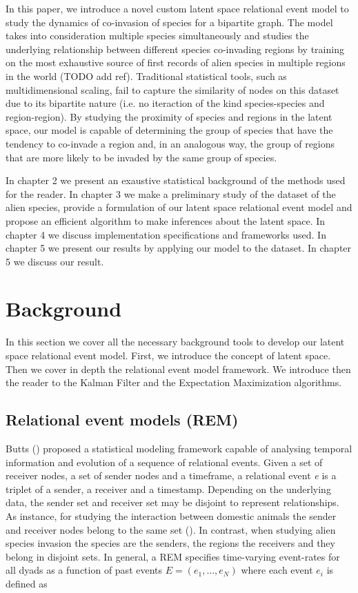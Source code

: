 \documentclass[mscthesis]{usiinfthesis}
\begin{document}
In this paper, we introduce a novel custom latent space relational event model to study the dynamics of co-invasion of species for a bipartite graph. The model takes into consideration multiple species simultaneously and studies the underlying relationship between different species co-invading regions by training on the most exhaustive source of first records of alien species in multiple regions in the world (TODO add ref). Traditional statistical tools, such as multidimensional scaling, fail to capture the similarity of nodes on this dataset due to its bipartite nature (i.e. no iteraction of the kind species-species and region-region). By studying the proximity of species and regions in the latent space, our model is capable of determining the group of species that have the tendency to co-invade a region and, in an analogous way, the group of regions that are more likely to be invaded by the same group of species. 

In chapter 2 we present an exaustive statistical background of the methods used for the reader. In chapter 3 we make a preliminary study of the  dataset of the alien species, provide a formulation of our latent space relational event model and propose an efficient algorithm to make inferences about the latent space. In chapter 4 we discuss implementation specifications and frameworks used. In chapter 5 we present our results by applying our model to the dataset. In chapter 5 we discuss our result.

\chapter{Background}

In this section we cover all the necessary background tools to develop our latent space relational event model. First, we introduce the concept of latent space. Then we cover in depth the relational event model framework. We introduce then the reader to the Kalman Filter and the Expectation Maximization algorithms. 

\section{Relational event models (REM)}

Butts (\citet{rem:butts}) proposed a statistical modeling framework capable of analysing temporal information and evolution of a sequence of relational events. Given a set of receiver nodes, a set of sender nodes and a timeframe, a relational event \textit{e} is a triplet of a sender, a receiver and a timestamp. Depending on the underlying data, the sender set and receiver set may be disjoint to represent relationships. As instance, for studying the interaction between domestic animals the sender and receiver nodes belong to the same set (\citep{intro:cattle}). In contrast, when studying alien species invasion the species are the senders, the regions the receivers and they belong in disjoint sets. In general, a REM specifies time-varying event-rates for all dyads as a function of past events $E=(e_1, ..., e_N)$ where each event $e_i$ is defined as
\end{document}
